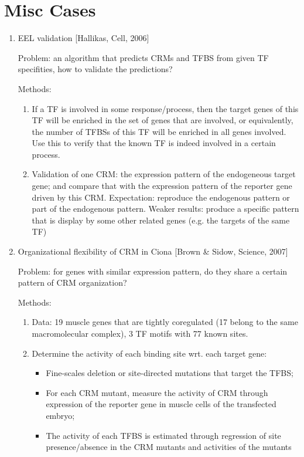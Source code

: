 \documentclass{report}
\begin{document}
\section{Misc Cases}
\begin{enumerate}
	
	\item{EEL validation} [Hallikas, Cell, 2006]
	
	Problem: an algorithm that predicts CRMs and TFBS from given TF specifities, how to validate the predictions?
	
	Methods:
	\begin{enumerate}
		\item If a TF is involved in some response/process, then the target genes of this TF will be enriched in the set of genes that are involved, or equivalently, the number of TFBSs of this TF will be enriched in all genes involved. Use this to verify that the known TF is indeed involved in a certain process.  
		\item Validation of one CRM: the expression pattern of the endogeneous target gene; and compare that with the expression pattern of the reporter gene driven by this CRM. Expectation: reproduce the endogenous pattern or part of the endogenous pattern. Weaker results: produce a specific pattern that is display by some other related genes (e.g. the targets of the same TF)
	\end{enumerate}	
	
	\item{Organizational flexibility of CRM in Ciona} [Brown \& Sidow, Science, 2007]
	
	Problem: for genes with similar expression pattern, do they share a certain pattern of CRM organization? 
	
	Methods:
	\begin{enumerate}
		\item Data: 19 muscle genes that are tightly coregulated (17 belong to the same macromolecular complex), 3 TF motifs with 77 known sites. 
		\item Determine the activity of each binding site wrt. each target gene:
		\begin{itemize}
			\item Fine-scales deletion or site-directed mutations that target the TFBS; 
			\item For each CRM mutant, measure the activity of CRM through expression of the reporter gene in muscle cells of the transfected embryo;  
			\item The activity of each TFBS is estimated through regression of site presence/absence in the CRM mutants and activities of the mutants 
		\end{itemize}
	\end{enumerate}
	

\end{enumerate}
\end{document}
